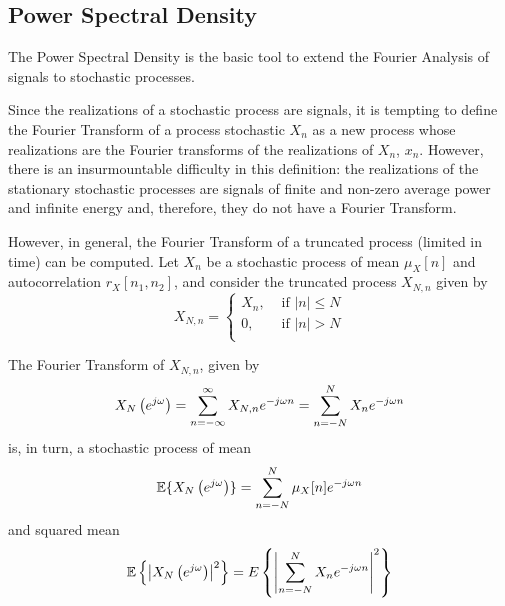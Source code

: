 %

\subsection{Power Spectral Density}
\label{sec:PowerSpectralDensity}

The Power Spectral Density is the basic tool to extend the Fourier Analysis of signals to stochastic processes. 

Since the realizations of a stochastic process are signals, it is tempting to define the Fourier Transform of a process
stochastic $X_n$ as a new process whose realizations are the Fourier transforms of the realizations of $X_n$, $x_n$. However, there is an insurmountable difficulty in this definition: the realizations of the stationary stochastic processes are signals of finite and non-zero average power and infinite energy and, therefore, they do not have a Fourier Transform.

However, in general, the Fourier Transform of a truncated process (limited in time) can be computed. Let $X_n$ be a stochastic process of mean $\mu_X[n]$ and autocorrelation $r_X[n_1, n_2]$, and consider the truncated process $X_{N,n}$ given by
\begin{equation}
  X_{N,n} = \left\{\begin{array}{ll}
      X_n, & \text{  if } |n| \leq N \\
      0,   & \text{  if } |n| > N    \\
    \end{array}
  \right.
\end{equation}

The Fourier Transform of $X_{N,n}$, given by
\begin{equation}
X_N\left(e^{j \omega}\right)
	= \sum_{n=-\infty}^\infty X_{N,n} e^{-j \omega n}
    = \sum_{n=-N}^N X_n e^{-j \omega n}
\end{equation}
is, in turn, a stochastic process of mean
\begin{equation}
\mathbb{E}\{X_N\left(e^{j \omega}\right)\} 
	= \sum_{n=-N}^N \mu_X[n] e^{-j \omega n}
\end{equation}
and squared mean
\begin{equation}
\mathbb{E}\left\{\left|X_N\left(e^{j \omega}\right)\right|^2\right\} 
	= E\left\{\left|\sum_{n=-N}^N X_n e^{-j \omega n} \right|^2 \right \}
\label{PMdeUT}
\end{equation}

